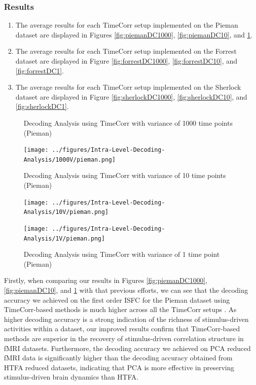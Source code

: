 \documentclass[11pt]{article}
\begin{document}
\subsubsection{Results}
\begin{enumerate}
\item The average results for each TimeCorr setup implemented on the Pieman dataset are displayed in Figures \ref{fig:piemanDC1000}, \ref{fig:piemanDC10}, and \ref{fig:piemanDC1}.
\item The average results for each TimeCorr setup implemented on the Forrest dataset are displayed in Figure \ref{fig:forrestDC1000}, \ref{fig:forrestDC10}, and \ref{fig:forrestDC1}.
\item The average results for each TimeCorr setup implemented on the Sherlock dataset are displayed in Figure \ref{fig:sherlockDC1000}, \ref{fig:sherlockDC10}, and \ref{fig:sherlockDC1}.
\end{enumerate}

\begin{figure}[!htb]
\caption{Decoding Analysis using TimeCorr with variance of 1000 time points (Pieman)}
\centering
\texttt{[image: ../figures/Intra-Level-Decoding-Analysis/1000V/pieman.png]}
\label{fig:piemanDC1000}
\caption{Decoding Analysis using TimeCorr with variance of 10 time points (Pieman)}
\centering
\texttt{[image: ../figures/Intra-Level-Decoding-Analysis/10V/pieman.png]}
\label{fig:piemanDC10}
\caption{Decoding Analysis using TimeCorr with variance of 1 time point (Pieman)}
\centering
\texttt{[image: ../figures/Intra-Level-Decoding-Analysis/1V/pieman.png]}
\label{fig:piemanDC1}
\end{figure}

Firstly, when comparing our results in Figures \ref{fig:piemanDC1000}, \ref{fig:piemanDC10}, and \ref{fig:piemanDC1} with that previous efforts, we can see that the decoding accuracy we achieved on the first order ISFC for the Pieman dataset using TimeCorr-based methods is much higher across all the TimeCorr setups \citep{jeremy2017}. As higher decoding accuracy is a strong indication of the richness of stimulus-driven activities within a dataset, our improved results confirm that TimeCorr-based methods are superior in the recovery of stimulus-driven correlation structure in fMRI datasets. Furthermore, the decoding accuracy we achieved on PCA reduced fMRI data is significantly higher than the decoding accuracy obtained from HTFA reduced datasets, indicating that PCA is more effective in preserving stimulus-driven brain dynamics than HTFA.
\end{document}
